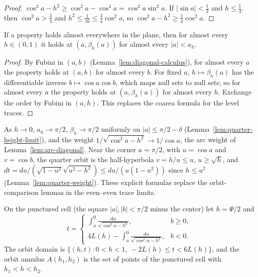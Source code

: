 \begin{proof}
\leanok
$\cos^2a-h^2\ge\cos^2a-\cos^4a=\cos^2a\sin^2a$. If $|\sin a|<\frac12$ and $h\le\frac14$, then
$\cos^2a>\frac34$ and $h^2\le\frac1{16}\le\frac34\cos^2a$, so $\cos^2a-h^2\ge\frac14\cos^2a$.
\end{proof}

\begin{lemma}
\label{lem:quarter-null-sets}
\leanok
If a property holds almost everywhere in the plane, then for almost every $h\in(0,1)$ it holds
at $(a,\beta_h(a))$ for almost every $|a|<a_h$.
\end{lemma}

\begin{proof}
\leanok
By Fubini in $(a,b)$ (Lemma~\ref{lem:diagonal-calculus}), for almost every $a$ the property holds
at $(a,b)$ for almost every $b$. For fixed $a$, $h\mapsto\beta_h(a)$ has the differentiable inverse
$b\mapsto\cos a\cos b$, which maps null sets to null sets; so for almost every $a$ the property
holds at $(a,\beta_h(a))$ for almost every $h$. Exchange the order by Fubini in $(a,h)$. This
replaces the coarea formula for the level traces.
\end{proof}

\begin{remark}
As $h\to0$, $a_h\to\pi/2$, $\beta_h\to\pi/2$ uniformly on $|a|\le\pi/2-\delta$
(Lemma~\ref{lem:quarter-height-limit}), and the weight $1/\sqrt{\cos^2a-h^2}\to1/\cos a$, the arc
weight of Lemma~\ref{lem:arc-diagonal}. Near the corner $a=\pi/2$, with $u=\cos a$ and
$v=\cos b$, the quarter orbit is the half-hyperbola $v=h/u\le u$, $u\ge\sqrt h$, and
$dt=du/(\sqrt{1-u^2}\sqrt{u^2-h^2})\le du/(u(1-u^2))$ since $h\le u^2$
(Lemma~\ref{lem:quarter-weight}). These explicit formulas
replace the orbit-comparison lemmas in the even--even trace limits.
\end{remark}

\begin{definition}
\label{def:orbit-coordinates}
\leanok
On the punctured cell (the square $|a|,|b|<\pi/2$ minus the center) let $h=\Psi/2$ and
\[
  t=\begin{cases}\displaystyle\int_a^0\frac{d\alpha}{\sqrt{\cos^2\alpha-h^2}},&b\ge0,\\[2ex]
  \displaystyle4L(h)-\int_a^0\frac{d\alpha}{\sqrt{\cos^2\alpha-h^2}},&b<0.\end{cases}
\]
The orbit domain is $\{(h,t):0<h<1,\ -2L(h)\le t<6L(h)\}$, and the orbit annulus
$A(h_1,h_2)$ is the set of points of the punctured cell with $h_1<h<h_2$.
\end{definition}

